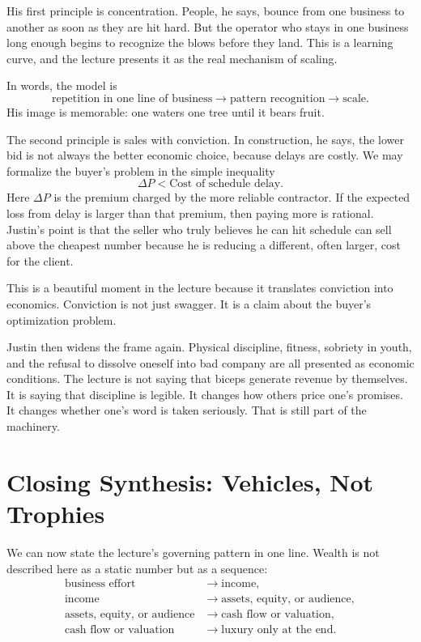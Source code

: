 His first principle is concentration. People, he says, bounce from one business to another as soon as they are hit hard. But the operator who stays in one business long enough begins to recognize the blows before they land. This is a learning curve, and the lecture presents it as the real mechanism of scaling.

In words, the model is
\begin{equation}
\text{repetition in one line of business} \longrightarrow \text{pattern recognition} \longrightarrow \text{scale}.
\end{equation}
His image is memorable: one waters one tree until it bears fruit.

The second principle is sales with conviction. In construction, he says, the lower bid is not always the better economic choice, because delays are costly. We may formalize the buyer's problem in the simple inequality
\begin{equation}
\Delta P < \text{Cost of schedule delay}.
\end{equation}
Here \(\Delta P\) is the premium charged by the more reliable contractor. If the expected loss from delay is larger than that premium, then paying more is rational. Justin's point is that the seller who truly believes he can hit schedule can sell above the cheapest number because he is reducing a different, often larger, cost for the client.

This is a beautiful moment in the lecture because it translates conviction into economics. Conviction is not just swagger. It is a claim about the buyer's optimization problem.

Justin then widens the frame again. Physical discipline, fitness, sobriety in youth, and the refusal to dissolve oneself into bad company are all presented as economic conditions. The lecture is not saying that biceps generate revenue by themselves. It is saying that discipline is legible. It changes how others price one's promises. It changes whether one's word is taken seriously. That is still part of the machinery.

\section{Closing Synthesis: Vehicles, Not Trophies}

We can now state the lecture's governing pattern in one line. Wealth is not described here as a static number but as a sequence:
\begin{align}
\text{business effort} &\longrightarrow \text{income},\\
\text{income} &\longrightarrow \text{assets, equity, or audience},\\
\text{assets, equity, or audience} &\longrightarrow \text{cash flow or valuation},\\
\text{cash flow or valuation} &\longrightarrow \text{luxury only at the end}.
\end{align}

